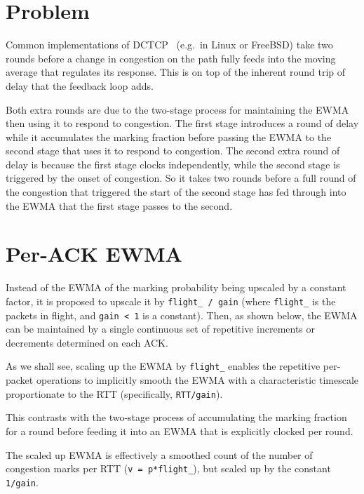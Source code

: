 \section{Problem}\label{prresp_Problem}

Common implementations of DCTCP~\cite{Alizadeh10:DCTCP} (e.g.\ in Linux or FreeBSD) take two rounds before a change in congestion on the path fully feeds into the moving average that regulates its response. This is on top of the inherent round trip of delay that the feedback loop adds.

Both extra rounds are due to the two-stage process for maintaining the EWMA then using it to respond to congestion. The first stage introduces a round of delay while it accumulates the marking fraction before passing the EWMA to the second stage that uses it to respond to congestion. The second extra round of delay is because the first stage clocks independently, while the second stage is triggered by the onset of congestion. So it takes two rounds before a full round of the congestion that triggered the start of the second stage has fed through into the EWMA that the first stage passes to the second.

\section{Per-ACK EWMA}\label{prresp_Per-Packet_EWMA}

Instead of the EWMA of the marking probability being upscaled by a constant factor, it is proposed to upscale it by \texttt{flight\_ / gain} (where \texttt{flight\_} is the packets in flight, and \texttt{gain < 1} is a constant). Then, as shown below, the EWMA can be maintained by a single continuous set of repetitive increments or decrements determined on each ACK.

As we shall see, scaling up the EWMA by \texttt{flight\_} enables the repetitive per-packet operations to implicitly smooth the EWMA with a characteristic timescale proportionate to the RTT (specifically, \texttt{RTT/gain}).

This contrasts with the two-stage process of accumulating the marking fraction for a round before feeding it into an EWMA that is explicitly clocked per round.

The scaled up EWMA is effectively a smoothed count of the number of congestion marks per RTT (\texttt{v = p*flight\_}), but scaled up by the constant \texttt{1/gain}. 

